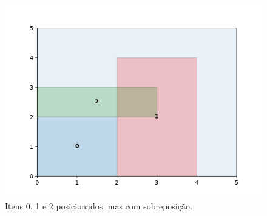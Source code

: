 \begin{figure}[H]
    \centering
    \includegraphics[scale=0.5]{utils/images/continuous_example2}
    \caption{Itens 0, 1 e 2 posicionados, mas com sobreposição.}
    \label{fig:sobreposicao-dominio2}
\end{figure}
